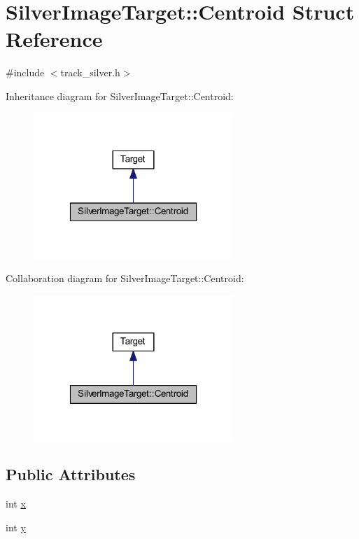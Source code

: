 \hypertarget{struct_silver_image_target_1_1_centroid}{\section{\-Silver\-Image\-Target\-:\-:\-Centroid \-Struct \-Reference}
\label{struct_silver_image_target_1_1_centroid}
}


{\ttfamily \#include $<$track\-\_\-silver.\-h$>$}



\-Inheritance diagram for \-Silver\-Image\-Target\-:\-:\-Centroid\-:\nopagebreak
\begin{figure}[H]
\begin{center}
\leavevmode
\includegraphics[width=214pt]{struct_silver_image_target_1_1_centroid__inherit__graph}
\end{center}
\end{figure}


\-Collaboration diagram for \-Silver\-Image\-Target\-:\-:\-Centroid\-:\nopagebreak
\begin{figure}[H]
\begin{center}
\leavevmode
\includegraphics[width=214pt]{struct_silver_image_target_1_1_centroid__coll__graph}
\end{center}
\end{figure}
\subsection*{\-Public \-Attributes}
\begin{DoxyCompactItemize}
\item 
int \hyperlink{struct_silver_image_target_1_1_centroid_abd7c429a2c46626db04c8a973b19e31d}{x}
\item 
int \hyperlink{struct_silver_image_target_1_1_centroid_a2363c14312ab1437ae52f8dc3b8f46c3}{y}
\end{DoxyCompactItemize}



